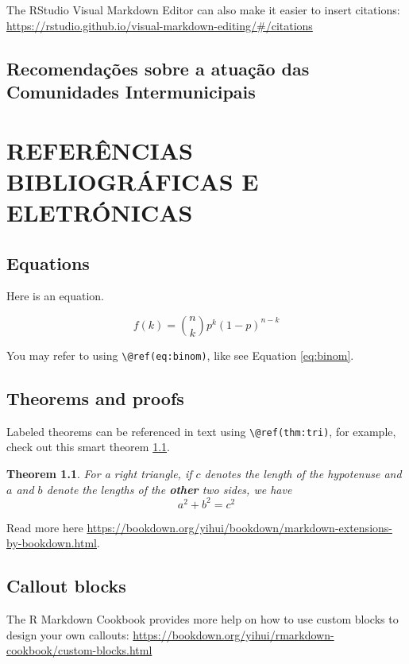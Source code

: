 \documentclass[
]{book}
\newtheorem{theorem}{Theorem}[chapter]
\theoremstyle{definition}
\theoremstyle{definition}
\theoremstyle{definition}
\theoremstyle{definition}
\theoremstyle{remark}
\begin{document}
The RStudio Visual Markdown Editor can also make it easier to insert citations: \url{https://rstudio.github.io/visual-markdown-editing/\#/citations}

\hypertarget{recomendauxe7uxf5es-sobre-a-atuauxe7uxe3o-das-comunidades-intermunicipais}{%
\section{Recomendações sobre a atuação das Comunidades Intermunicipais}\label{recomendauxe7uxf5es-sobre-a-atuauxe7uxe3o-das-comunidades-intermunicipais}}

\hypertarget{referuxeancias-bibliogruxe1ficas-e-eletruxf3nicas}{%
\chapter*{REFERÊNCIAS BIBLIOGRÁFICAS E ELETRÓNICAS}\label{referuxeancias-bibliogruxe1ficas-e-eletruxf3nicas}}

\hypertarget{equations}{%
\section{Equations}\label{equations}}

Here is an equation.

\begin{equation} 
  f\left(k\right) = \binom{n}{k} p^k\left(1-p\right)^{n-k}
  \label{eq:binom}
\end{equation}

You may refer to using \texttt{\textbackslash{}@ref(eq:binom)}, like see Equation \eqref{eq:binom}.

\hypertarget{theorems-and-proofs}{%
\section{Theorems and proofs}\label{theorems-and-proofs}}

Labeled theorems can be referenced in text using \texttt{\textbackslash{}@ref(thm:tri)}, for example, check out this smart theorem \ref{thm:tri}.

\begin{theorem}
\protect\hypertarget{thm:tri}{}\label{thm:tri}For a right triangle, if \(c\) denotes the \emph{length} of the hypotenuse
and \(a\) and \(b\) denote the lengths of the \textbf{other} two sides, we have
\[a^2 + b^2 = c^2\]
\end{theorem}

Read more here \url{https://bookdown.org/yihui/bookdown/markdown-extensions-by-bookdown.html}.

\hypertarget{callout-blocks}{%
\section{Callout blocks}\label{callout-blocks}}

The R Markdown Cookbook provides more help on how to use custom blocks to design your own callouts: \url{https://bookdown.org/yihui/rmarkdown-cookbook/custom-blocks.html}

  
\end{document}

